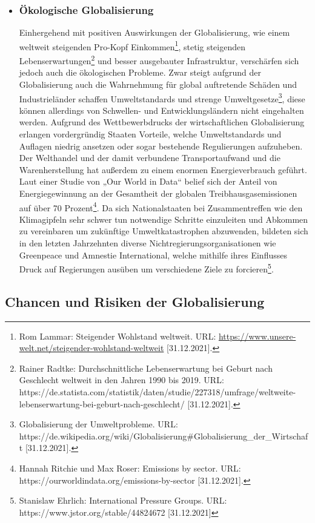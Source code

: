 \documentclass[12pt]{article}
\begin{document}
\begin{itemize}
    \item \subsubsection{Ökologische Globalisierung}
    Einhergehend mit positiven Auswirkungen der Globalisierung, wie einem weltweit steigenden Pro-Kopf Einkommen\footnote{Rom Lammar: Steigender Wohlstand weltweit. URL: \url{https://www.unsere-welt.net/steigender-wohlstand-weltweit} [31.12.2021].}, stetig steigenden Lebenserwartungen\footnote{Rainer Radtke: Durchschnittliche Lebenserwartung bei Geburt nach Geschlecht weltweit in den Jahren 1990 bis 2019. URL: https://de.statista.com/statistik/daten/studie/227318/umfrage/weltweite-lebenserwartung-bei-geburt-nach-geschlecht/ [31.12.2021].} und besser ausgebauter Infrastruktur, verschärfen sich jedoch auch die ökologischen Probleme. Zwar steigt aufgrund der Globalisierung auch die Wahrnehmung für global auftretende Schäden und Industrieländer schaffen Umweltstandards und strenge Umweltgesetze\footnote{Globalisierung der Umweltprobleme. URL: https://de.wikipedia.org/wiki/Globalisierung#Globalisierung_der_Wirtschaft [31.12.2021].}, diese können allerdings von Schwellen- und Entwicklungsländern nicht eingehalten werden. Aufgrund des Wettbewerbdrucks der wirtschaftlichen Globalisierung erlangen vordergründig Staaten Vorteile, welche Umweltstandards und Auflagen niedrig ansetzen oder sogar bestehende Regulierungen aufzuheben. Der Welthandel und der damit verbundene Transportaufwand und die Warenherstellung hat außerdem zu einem enormen Energieverbrauch geführt. Laut einer Studie von „Our World in Data“ belief sich der Anteil von Energiegewinnung an der Gesamtheit der globalen Treibhausgasemissionen auf über 70 Prozent\footnote{Hannah Ritchie und Max Roser: Emissions by sector. URL: https://ourworldindata.org/emissions-by-sector [31.12.2021].}. Da sich Nationalstaaten bei Zusammentreffen wie den Klimagipfeln sehr schwer tun notwendige Schritte einzuleiten und Abkommen zu vereinbaren um zukünftige Umweltkatastrophen abzuwenden, bildeten sich in den letzten Jahrzehnten diverse Nichtregierungsorganisationen wie Greenpeace und Amnestie International, welche mithilfe ihres Einflusses Druck auf Regierungen ausüben um verschiedene Ziele zu forcieren\footnote{Stanislaw Ehrlich: International Pressure Groups. URL: https://www.jstor.org/stable/44824672 [31.12.2021]}.
\end{itemize}
\subsection{Chancen und Risiken der Globalisierung}
\end{document}
